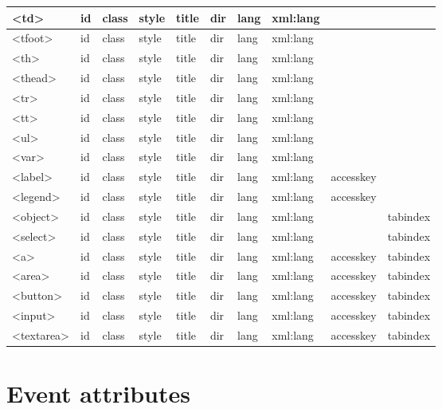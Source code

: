 \begin{longtable}{|l|l|l|l|l|l|l|l|l|l|}
\hline
<td>			&	id &	class &	style &	title & dir & 	lang	& xml:lang & 			&		 \\
\hline
<tfoot>		&	id &	class &	style &	title & dir & 	lang	& xml:lang & 			&		 \\
\hline
<th>			&	id &	class &	style &	title & dir & 	lang	& xml:lang & 			&		 \\
\hline
<thead>		&	id &	class &	style &	title & dir & 	lang	& xml:lang & 			&		 \\
\hline
<tr>			&	id &	class &	style &	title & dir & 	lang	& xml:lang & 			&		 \\
\hline
<tt>	          	&	id &	class &	style &	title & dir & 	lang	& xml:lang & 			&		 \\
\hline
<ul>            	&	id &	class &	style &	title & dir & 	lang	& xml:lang & 			&		 \\
\hline
<var>	   	&	id &	class &	style &	title & dir & 	lang	& xml:lang & 			&		 \\
\hline
<label>	   	&	id &	class &	style &	title & dir & 	lang	& xml:lang & accesskey &  		  \\
\hline
<legend>	   	&	id &	class &	style &	title & dir & 	lang	& xml:lang & accesskey & 		  \\
\hline
<object>	   	&	id &	class &	style &	title & dir & 	lang	& xml:lang & 			& tabindex \\
\hline
<select>	   	&	id &	class &	style &	title & dir & 	lang	& xml:lang & 			& tabindex \\
\hline
<a>	           	&	id &	class &	style &	title & dir & 	lang	& xml:lang & accesskey & tabindex \\
\hline
<area>	   	&	id &	class &	style &	title & dir & 	lang	& xml:lang & accesskey & tabindex \\
\hline
<button>	   	&	id &	class &	style &	title & dir & 	lang	& xml:lang & accesskey & tabindex \\
\hline
<input>	   	&	id &	class &	style &	title & dir & 	lang	& xml:lang & accesskey & tabindex \\
\hline
<textarea> 	&	id &	class &	style &	title & dir & 	lang	& xml:lang & accesskey & tabindex \\
\hline
\end{longtable}






\section{Event attributes}


